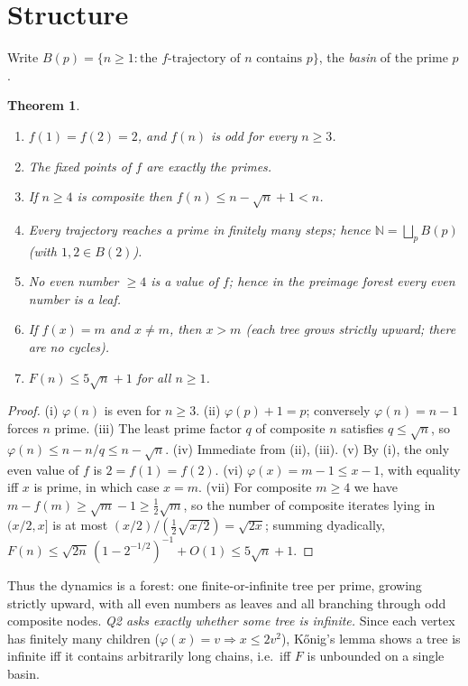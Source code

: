 \documentclass[11pt,a4paper]{article}
\newtheorem{theorem}{Theorem}
\theoremstyle{remark}
\newcommand{\N}{\mathbb{N}}
\begin{document}
\section{Structure}

Write $B(p)=\{n\ge 1:\text{the $f$-trajectory of $n$ contains }p\}$, the \emph{basin} of the prime $p$.

\begin{theorem}\label{thm:structure}
\begin{enumerate}
\item[(i)] $f(1)=f(2)=2$, and $f(n)$ is odd for every $n\ge 3$.
\item[(ii)] The fixed points of $f$ are exactly the primes.
\item[(iii)] If $n\ge 4$ is composite then $f(n)\le n-\sqrt n+1<n$.
\item[(iv)] Every trajectory reaches a prime in finitely many steps; hence $\N=\bigsqcup_p B(p)$ (with $1,2\in B(2)$).
\item[(v)] No even number $\ge 4$ is a value of $f$; hence in the preimage forest every even number is a leaf.
\item[(vi)] If $f(x)=m$ and $x\neq m$, then $x>m$ (each tree grows strictly upward; there are no cycles).
\item[(vii)] $F(n)\le 5\sqrt n+1$ for all $n\ge 1$.
\end{enumerate}
\end{theorem}

\begin{proof}
(i) $\varphi(n)$ is even for $n\ge 3$. (ii) $\varphi(p)+1=p$; conversely $\varphi(n)=n-1$ forces $n$ prime. (iii) The least prime factor $q$ of composite $n$ satisfies $q\le\sqrt n$, so $\varphi(n)\le n-n/q\le n-\sqrt n$. (iv) Immediate from (ii), (iii). (v) By (i), the only even value of $f$ is $2=f(1)=f(2)$. (vi) $\varphi(x)=m-1\le x-1$, with equality iff $x$ is prime, in which case $x=m$. (vii) For composite $m\ge 4$ we have $m-f(m)\ge\sqrt m-1\ge\tfrac12\sqrt m$, so the number of composite iterates lying in $(x/2,x]$ is at most $(x/2)\big/(\tfrac12\sqrt{x/2})=\sqrt{2x}$; summing dyadically, $F(n)\le\sqrt{2n}\,(1-2^{-1/2})^{-1}+O(1)\le 5\sqrt n+1$.
\end{proof}

Thus the dynamics is a forest: one finite-or-infinite tree per prime, growing strictly upward, with all even numbers as leaves and all branching through odd composite nodes. \emph{Q2 asks exactly whether some tree is infinite.} Since each vertex has finitely many children ($\varphi(x)=v\Rightarrow x\le 2v^2$), K\H{o}nig's lemma shows a tree is infinite iff it contains arbitrarily long chains, i.e.\ iff $F$ is unbounded on a single basin.
\end{document}
